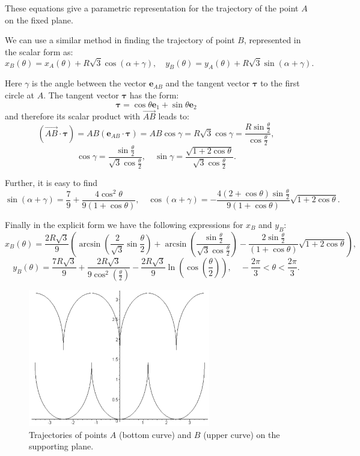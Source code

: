 \documentclass[10pt]{enoc2011}
\renewcommand{\vec}[1]{\boldsymbol{#1}}
\begin{document}
These equations give a parametric representation for the trajectory of the point $A$ on the fixed plane.

We can use a similar method in finding the trajectory of point $B$, 
represented in the scalar form as:
$$
x_B\left(\theta\right)=x_A\left(\theta\right)+R\sqrt{3}\cos\left(\alpha+\gamma\right),\quad
y_B\left(\theta\right)=y_A\left(\theta\right)+R\sqrt{3}\sin\left(\alpha+\gamma\right).
$$

Here $\gamma$ is the angle between the vector $\vec e_{AB}$ and the tangent vector $\vec\tau$ to the first circle at $A$. The tangent vector $\vec\tau$ has the form:
$$
\vec\tau=\cos\theta\vec e_1+\sin\theta\vec e_2
$$
and therefore its scalar product with $\overrightarrow{AB}$ leads to:
$$
\left(\overrightarrow{AB}\cdot\vec\tau\right)=AB\left(\vec e_{AB}\cdot\vec\tau\right)=AB\cos\gamma=
R\sqrt{3}\cos\gamma=\frac{R\sin\frac{\theta}{2}}{\cos\frac{\theta}{2}},
$$
$$
\cos\gamma=\frac{\sin\frac{\theta}{2}}{\sqrt{3}\cos\frac{\theta}{2}},\quad
\sin\gamma=\frac{\sqrt{1+2\cos\theta}}{\sqrt{3}\cos\frac{\theta}{2}}.
$$

Further, it is easy to find
$$
\sin\left(\alpha+\gamma\right)=\frac{7}{9}+\frac{4\cos^2\theta}{9\left(1+\cos\theta\right)},\quad
\cos\left(\alpha+\gamma\right)=-\frac{4\left(2+\cos\theta\right)\sin\frac{\theta}{2}}{9\left(1+\cos\theta\right)}
\sqrt{1+2\cos\theta}.
$$

Finally in the explicit form we have the following expressions for $x_B$ and $y_B$:
$$
x_B\left(\theta\right)\!=\!\frac{2R\sqrt{3}}{9}\left(\arcsin\left(\frac{2}{\sqrt{3}}\sin\frac{\theta}{2}\right)\!+\!
\arcsin\left(\frac{\sin\frac{\theta}{2}}{\sqrt{3}\cos\frac{\theta}{2}}\right)\!-\!
\frac{2\sin\frac{\theta}{2}}{\left(1\!+\!\cos\theta\right)}\sqrt{1\!+\!2\cos\theta}\right),
$$
$$
y_B\left(\theta\right)=\frac{7R\sqrt{3}}{9}+\frac{2R\sqrt{3}}{9\cos^2\left(\frac{\theta}{2}\right)}-\frac{2R\sqrt{3}}{9}\ln\left(\cos\left(\frac{\theta}{2}\right)\right),
\quad -\frac{2\pi}{3}<\theta<\frac{2\pi}{3}.
$$

\begin{figure}[h]
\centering\includegraphics[height=6cm]{Oloid3}
\caption{Trajectories of points $A$ (bottom curve) and $B$ (upper curve) on the supporting plane.}
\end{figure}
\end{document}
